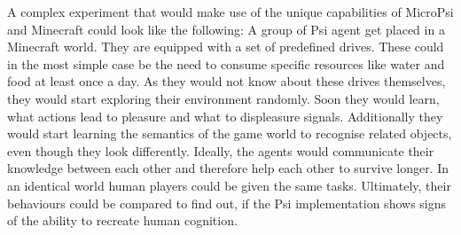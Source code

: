 A complex experiment that would make use of the unique capabilities of MicroPsi and Minecraft could look like the following:
A group of Psi agent get placed in a Minecraft world. They are equipped with a set of predefined drives. These could in the most simple case be the need to consume specific resources like water and food at least once a day. As they would not know about these drives themselves, they would start exploring their environment randomly. Soon they would learn, what actions lead to pleasure and what to displeasure signals. Additionally they would start learning the semantics of the game world to recognise related objects, even though they look differently. Ideally, the agents would communicate their knowledge between each other and therefore help each other to survive longer. In an identical world human players could be given the same tasks. Ultimately, their behaviours could be compared to find out, if the Psi implementation shows signs of the ability to recreate human cognition.